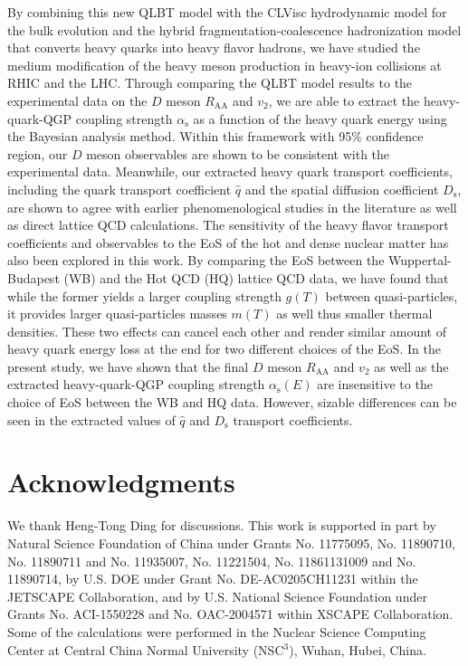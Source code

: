 \documentclass[aps,superscriptaddress,prc,twocolumn,nofootinbib]{revtex4}
\begin{document}
By combining this new QLBT model with the CLVisc hydrodynamic model for the bulk evolution and the hybrid fragmentation-coalescence hadronization model that converts heavy quarks into heavy flavor hadrons, we have studied the medium modification of the heavy meson production in heavy-ion collisions at RHIC and the LHC. Through comparing the QLBT model results to the experimental data on the $D$ meson $R_\mathrm{AA}$ and $v_2$, we are able to extract the heavy-quark-QGP coupling strength $\alpha_\mathrm{s}$ as a function of the heavy quark energy using the Bayesian analysis method. Within this framework with 95\% confidence region, our $D$ meson observables are shown to be consistent with the experimental data. Meanwhile, our extracted heavy quark transport coefficients, including the quark transport coefficient $\hat{q}$ and the spatial diffusion coefficient $D_\mathrm{s}$, are shown to agree with earlier phenomenological studies in the literature as well as direct lattice QCD calculations. The sensitivity of the heavy flavor transport coefficients and observables to the EoS of the hot and dense nuclear matter has also been explored in this work. By comparing the EoS between the Wuppertal-Budapest (WB) and the Hot QCD (HQ) lattice QCD data, we have found that while the former yields a larger coupling strength $g(T)$ between quasi-particles, it provides larger quasi-particles masses $m(T)$ as well thus smaller thermal densities. These two effects can cancel each other and render similar amount of heavy quark energy loss at the end for two different choices of the EoS.
In the present study, we have shown that the final $D$ meson $R_\mathrm{AA}$ and $v_2$ as well as the extracted heavy-quark-QGP coupling strength $\alpha_\mathrm{s}(E)$ are insensitive to the choice of EoS between the WB and HQ data.
However, sizable differences can be seen in the extracted values of $\hat{q}$ and $D_\mathrm{s}$ transport coefficients.



\section*{Acknowledgments}

We thank Heng-Tong Ding for discussions. This work is supported in part by Natural Science Foundation of China under Grants No. 11775095, No. 11890710, No. 11890711 and No. 11935007, No. 11221504, No. 11861131009 and No. 11890714, by U.S. DOE under Grant No. DE-AC0205CH11231 within the JETSCAPE Collaboration, and by U.S. National Science Foundation under Grants No. ACI-1550228 and No. OAC-2004571 within XSCAPE Collaboration.
Some of the calculations were performed in the Nuclear Science Computing Center at Central China Normal University (NSC$^3$), Wuhan, Hubei, China.



\end{document}
